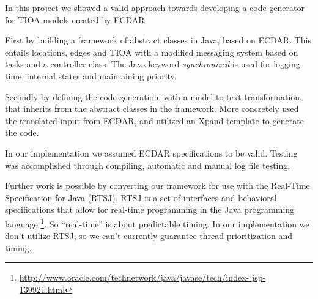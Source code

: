 In this project we showed a valid approach towards developing a code 
generator for TIOA models created by ECDAR. 

First by building a framework of abstract classes in Java, based on 
ECDAR. This entails locations, edges and TIOA with a modified messaging 
system based on tasks and a controller class. The Java keyword 
\textit{synchronized} is used for logging time, internal states and 
maintaining priority. 

Secondly by defining the code generation, with a model to text 
transformation, that inherits from the abstract classes in the 
framework. More concretely used the translated input from ECDAR, and 
utilized an Xpand-template to generate the code. 

In our implementation we assumed ECDAR specifications to be valid. 
Testing was accomplished through compiling, automatic and manual log 
file testing. 

Further work is possible by converting our framework for use with the 
Real-Time Specification for Java (RTSJ). RTSJ is a set of interfaces and 
behavioral specifications that allow for real-time programming in the 
Java programming language 
\footnote{\url{http://www.oracle.com/technetwork/java/javase/tech/index- 
jsp-139921.html}}. So ``real-time'' is about predictable timing. In our 
implementation we don't utilize RTSJ, so we can't currently guarantee 
thread prioritization and timing. 

